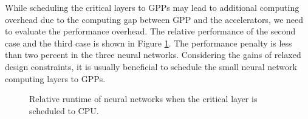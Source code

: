 While scheduling the critical layers to GPPs may lead to additional computing overhead
due to the computing gap between GPP and the accelerators, we need to evaluate the
performance overhead. The relative performance of the second case and the third case
is shown in Figure \ref{fig:clp_perf}. The performance penalty is less than two percent
in the three neural networks. Considering the gains of relaxed design constraints,
it is usually beneficial to schedule the small neural network computing layers to GPPs.

\begin{figure}
        \caption{Relative runtime of neural networks when the critical layer is scheduled to CPU.}
        \label{fig:clp_perf}
\end{figure}

